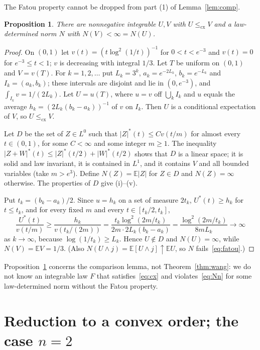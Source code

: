 \documentclass[11pt]{amsart}
\newtheorem{proposition}[theorem]{Proposition}
\theoremstyle{definition}
\newcommand{\E}{\mathbb{E}}
\newcommand{\cx}{\le_{\mathrm{cx}}}
\begin{document}
The Fatou property cannot be dropped from part (1) of Lemma~\ref{lem:comp}.

\begin{proposition}\label{prop:nonfatou}
There are nonnegative integrable $U,V$ with $U\cx V$ and a law-determined norm $N$ with $N(V)<\infty=N(U)$.
\end{proposition}

\begin{proof}
On $(0,1)$ let $v(t)=(t\log^2(1/t))^{-1}$ for $0<t<e^{-3}$ and $v(t)=0$ for $e^{-3}\le t<1$; $v$ is decreasing with
integral $1/3$. Let $T$ be uniform on $(0,1)$ and $V=v(T)$. For $k=1,2,\dots$ put $L_k=3^k$, $a_k=e^{-2L_k}$,
$b_k=e^{-L_k}$ and $I_k=(a_k,b_k)$; these intervals are disjoint and lie in $(0,e^{-3})$, and
$\int_{I_k}v=1/(2L_k)$. Let $U=u(T)$, where $u=v$ off $\bigcup_kI_k$ and $u$ equals the average
$h_k=(2L_k(b_k-a_k))^{-1}$ of $v$ on $I_k$. Then $U$ is a conditional expectation of $V$, so $U\cx V$.

Let $D$ be the set of $Z\in L^0$ such that $|Z|^*(t)\le Cv(t/m)$ for almost every $t\in(0,1)$, for some $C<\infty$
and some integer $m\ge1$. The inequality $|Z+W|^*(t)\le|Z|^*(t/2)+|W|^*(t/2)$ shows that $D$ is a linear space; it
is solid and law invariant, it is contained in $L^1$, and it contains $V$ and all bounded variables (take $m>e^3$).
Define $N(Z)=\E|Z|$ for $Z\in D$ and $N(Z)=\infty$ otherwise. The properties of $D$ give (i)--(v).

Put $t_k=(b_k-a_k)/2$. Since $u=h_k$ on a set of measure $2t_k$, $U^*(t)\ge h_k$ for $t\le t_k$, and for every fixed
$m$ and every $t\in[t_k/2,t_k]$,
\[
\frac{U^*(t)}{v(t/m)}\ge\frac{h_k}{v(t_k/(2m))}=\frac{t_k\log^2(2m/t_k)}{2m\cdot2L_k(b_k-a_k)}
=\frac{\log^2(2m/t_k)}{8mL_k}\to\infty
\]
as $k\to\infty$, because $\log(1/t_k)\ge L_k$. Hence $U\notin D$ and $N(U)=\infty$, while $N(V)=\E V=1/3$. (Also
$N(U\wedge j)=\E[U\wedge j]\uparrow\E U$, so $N$ fails~\eqref{eq:fatou}.)
\end{proof}

Proposition~\ref{prop:nonfatou} concerns the comparison lemma, not Theorem~\ref{thm:wang}: we do not know an
integrable law $F$ that satisfies~\eqref{eq:cx} and violates~\eqref{eq:Nn} for some law-determined norm without the
Fatou property.

\section{Reduction to a convex order; the case \texorpdfstring{$n=2$}{n=2}}\label{sec:reduction}
\end{document}
